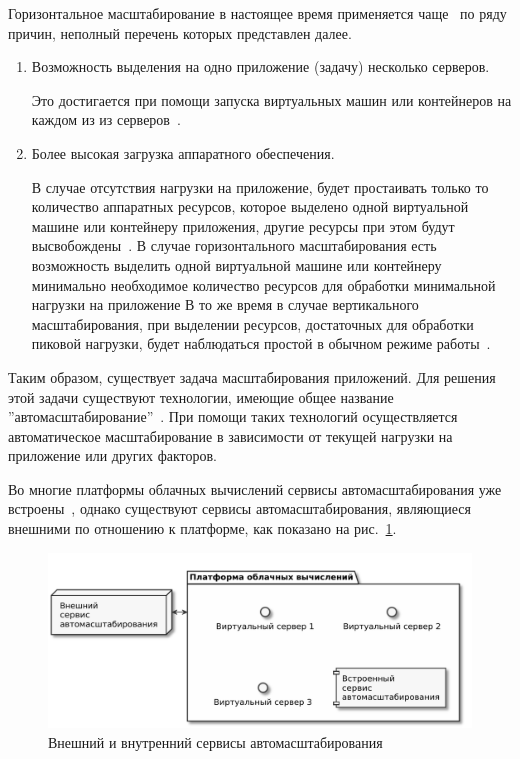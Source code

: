 Горизонтальное масштабирование в настоящее время применяется чаще~\cite{fake-24} по ряду причин, неполный перечень которых представлен далее.
\begin{enumerate}
    \item Возможность выделения на одно приложение (задачу) несколько серверов.
    
    Это достигается при помощи запуска виртуальных машин или контейнеров на каждом из из серверов~\cite{fake-28}.
    
    \item Более высокая загрузка аппаратного обеспечения.
    
    В случае отсутствия нагрузки на приложение, будет простаивать только то количество аппаратных ресурсов, которое выделено одной виртуальной машине или контейнеру приложения, другие ресурсы при этом будут высвобождены~\cite{fake-25}.
    В случае горизонтального масштабирования есть возможность выделить одной виртуальной машине или контейнеру минимально необходимое количество ресурсов для обработки минимальной нагрузки на приложение
    В то же время в случае вертикального масштабирования, при выделении ресурсов, достаточных для обработки пиковой нагрузки, будет наблюдаться простой в обычном режиме работы~\cite{fake-26}. 
\end{enumerate}

Таким образом, существует задача масштабирования приложений.
Для решения этой задачи существуют технологии, имеющие общее название ''автомасштабирование''~\cite{portable-autoscaler-for-managing-multi-cloud-elasticity}.
При помощи таких технологий осуществляется автоматическое масштабирование в зависимости от текущей нагрузки на приложение или других факторов.

Во многие платформы облачных вычислений сервисы автомасштабирования уже встроены~\cite{fake-32}, однако существуют сервисы автомасштабирования, являющиеся внешними по отношению к платформе, как показано на рис.~\ref{ext-int-scaler}.

\begin{figure}[hbtp]
    \centering
    \includegraphics[width=\textwidth]{img/ext-int-scaler.pdf}
    \caption{Внешний и внутренний сервисы автомасштабирования}
    \label{ext-int-scaler}
\end{figure}

